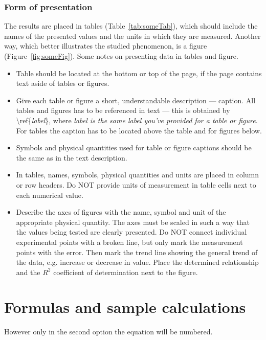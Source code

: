 \documentclass[12pt,a4paper]{article}
\begin{document}
	\subsubsection{Form of presentation}
	The results are placed in tables (Table~\ref{tab:someTab}), which should include the names of the presented values and the units in which they are measured. 
	Another way, which better illustrates the studied phenomenon, is a figure (Figure~\ref{fig:someFig}). 
	Some notes on presenting data in tables and figure.
	\begin{itemize}
		\item Table should be located at the bottom or top of the page, if the page contains text aside of tables or figures. 
		\item Give each table or figure a short, understandable description --- caption. 
		All tables and figures has to be referenced in text --- this is obtained by \textbackslash ref\{{\it label}\}, where {\it label is the same label you've provided for a table or figure}. 
		For tables the caption has to be located above the table and for figures below.
		\item Symbols and physical quantities used for table or figure captions should be the same as in the text description.
		\item In tables, names, symbols, physical quantities and units are placed in column or row headers. 
		Do NOT provide units of measurement in table cells next to each numerical value. 
		\item Describe the axes of figures with the name, symbol and unit of the appropriate physical quantity. 
		The axes must be scaled in such a way that the values being tested are clearly presented. 
		Do NOT connect individual experimental points with a broken line, but only mark the measurement points with the error. 
		Then mark the trend line showing the general trend of the data, e.g. increase or decrease in value. 
		Place the determined relationship and the $R^2$ coefficient of determination next to the figure.
	\end{itemize}
	
	\section{Formulas and sample calculations}
	
	
	\noindent
	However only in the second option the equation will be numbered.
	
\end{document}
